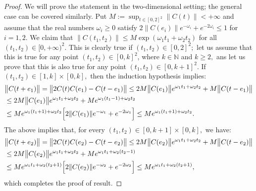 \documentclass{amsart}
\theoremstyle{definition}
\theoremstyle{remark}
\numberwithin{equation}{section}
\begin{document}
\begin{proof}
We will prove the statement in the two-dimensional setting; the general case can be covered similarly. Put $M:=\sup_{t\in [0,2]^{2}}\| C(t)\|<+\infty$ and assume that the real numbers $\omega_{i}\geq 0$ satisfy $2\| C(e_{i})\| e^{-\omega_{i}}+e^{-2\omega_{i}}\leq 1$ for $i=1,2.$ We claim that $\| C(t_{1},t_{2})\| \leq M\exp(\omega_{1}t_{1}+\omega_{2}t_{2})$ for all $(t_{1},t_{2}) \in [0,+\infty)^{2}.$  This is clearly true if $(t_{1},t_{2}) \in [0,2]^{2};$ let us assume that this is true for any point $(t_{1},t_{2}) \in [0,k]^{2}$, where $k\in {\mathbb N}$ and $k\geq 2,$ ans let us prove that this is also true for any point $(t_{1},t_{2}) \in [0,k+1]^{2}.$ If  $(t_{1},t_{2}) \in [1,k] \times [0,k],$ then the induction hypothesis implies:
\begin{align*}&
\bigl\| C(t+e_{1})\bigr\| =\bigl\| 2C(t)C(e_{1})-C(t-e_{1})\bigr\| \leq  2M\bigl\| C(e_{1})\bigr\|e^{\omega_{1}t_{1}+\omega_{2}t_{2}}+M\bigl\| C(t-e_{1}) \bigr\| 
\\& \leq 2M\bigl\| C(e_{1})\bigr\|e^{\omega_{1}t_{1}+\omega_{2}t_{2}}+Me^{\omega_{1}(t_{1}-1)+\omega_{2}t_{2}}
\\& \leq Me^{\omega_{1}(t_{1}+1)+\omega_{2}t_{2}}\Bigl[ 2\| C(e_{1})\| e^{-\omega_{1}}+e^{-2\omega_{1}} \Bigr] \leq Me^{\omega_{1}(t_{1}+1)+\omega_{2}t_{2}}.
\end{align*} 
The above implies that, for every $ (t_{1},t_{2}) \in [0,k+1] \times [0,k],$ we have:
\begin{align*}&
\bigl\| C(t+e_{2})\bigr\| =\bigl\| 2C(t)C(e_{2})-C(t-e_{2})\bigr\| \leq  2M\bigl\| C(e_{2})\bigr\|e^{\omega_{1}t_{1}+\omega_{2}t_{2}}+M\bigl\| C(t-e_{2}) \bigr\| 
\\& \leq 2M\bigl\| C(e_{2})\bigr\|e^{\omega_{1}t_{1}+\omega_{2}t_{2}}+Me^{\omega_{1}t_{1}+\omega_{2}(t_{2}-1)}
\\& \leq Me^{\omega_{1}t_{1}+\omega_{2}(t_{2}+1)}\Bigl[2\| C(e_{2})\| e^{-\omega_{2}}+e^{-2\omega_{2}} \Bigr] \leq Me^{\omega_{1}t_{1}+\omega_{2}(t_{2}+1)},
\end{align*} 
which completes the proof of result.
\end{proof}
\end{document}
